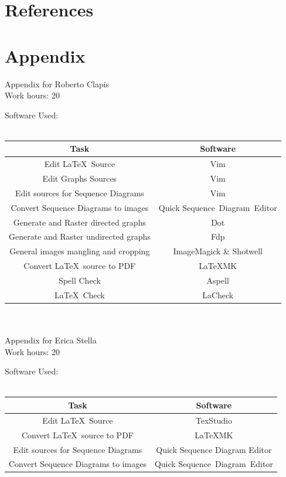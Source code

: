 \documentclass{article}
\begin{document}
	\section{References}
	\clearpage
	\section{Appendix}
	Appendix for Roberto Clapis\\
	Work hours: 20
	\begin{center}
		Software Used:\\
		\-\\
		\begin{tabular}{*{2}{c}}
			\toprule
			Task & Software \\
			\midrule
			Edit \LaTeX\ Source & Vim\\
			Edit Graphs Sources & Vim\\
			Edit sources for Sequence Diagrams & Vim\\
			Convert Sequence Diagrams to images & Quick Sequence Diagram Editor\\
			Generate and Raster directed graphs& Dot\\
			Generate and Raster undirected graphs& Fdp\\
			General images mangling and cropping & ImageMagick \& Shotwell\\
			Convert \LaTeX\ source to PDF & \LaTeX\-MK\\
			Spell Check & Aspell \\
			\LaTeX\ Check & LaCheck\\
			\bottomrule
		\end{tabular}
	\end{center}
	\-\\
	\-\\
	Appendix for Erica Stella\\
	Work hours: 20
	\begin{center}
		Software Used:\\
		\-\\
		\begin{tabular}{*{2}{c}}
			\toprule
			Task & Software \\
			\midrule
			Edit \LaTeX\ Source & TexStudio\\
			Convert \LaTeX\ source to PDF & \LaTeX\-MK\\
			Edit sources for Sequence Diagrams & Quick Sequence Diagram Editor\\
			Convert Sequence Diagrams to images & Quick Sequence Diagram Editor\\
			\bottomrule
		\end{tabular}
	\end{center}

	
\end{document}

